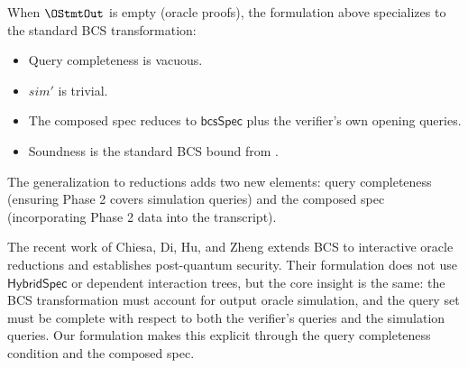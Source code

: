 \begin{remark}
  \label{bcs:comparison-with-proofs}
  When $\OStmtOut$ is empty (oracle proofs), the formulation above
  specializes to the standard BCS transformation:
  \begin{itemize}
    \item Query completeness is vacuous.
    \item $\mathit{sim}'$ is trivial.
    \item The composed spec reduces to $\mathsf{bcsSpec}$ plus
      the verifier's own opening queries.
    \item Soundness is the standard BCS bound from
      \cite{BCS16}.
  \end{itemize}
  The generalization to reductions adds two new elements: query
  completeness (ensuring Phase 2 covers simulation queries) and the
  composed spec (incorporating Phase 2 data into the transcript).
\end{remark}

\begin{remark}
  \label{bcs:cdh-comparison}
  The recent work of Chiesa, Di, Hu, and Zheng
  \cite{ChiesaDiHuZheng2025}
  extends BCS to interactive oracle reductions and establishes
  post-quantum security.
  Their formulation does not use $\mathsf{HybridSpec}$ or dependent
  interaction trees, but the core insight is the same: the BCS
  transformation must account for output oracle simulation, and the
  query set must be complete with respect to both the verifier's queries
  and the simulation queries.
  Our formulation makes this explicit through the query completeness
  condition and the composed spec.
\end{remark}
